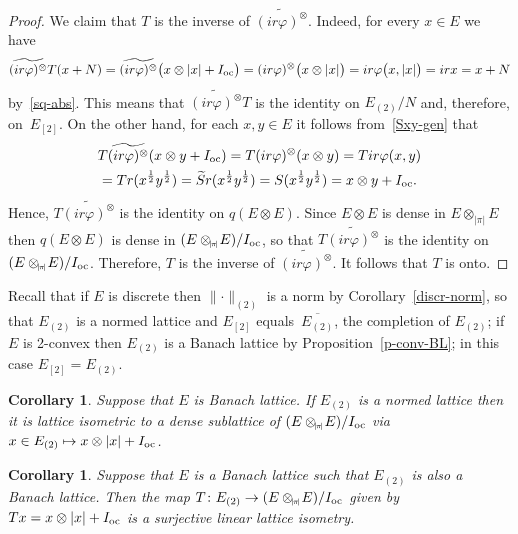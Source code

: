 \documentclass[12pt]{amsart}
\theoremstyle{plain}
\newtheorem{corollary}[theorem]{Corollary}
\theoremstyle{definition}
\newcommand{\abs}[1]{\lvert#1\rvert}
\newcommand{\norm}[1]{\lVert#1\rVert}
\def\api{{\abs{\!\pi\!}}}
\def\ftp{\otimes_{\!\scriptscriptstyle\api}\!}
\def\Ioc{I_{\rm oc}}
\begin{document}
\begin{proof}
  We claim that $T$ is the inverse of
  $\widetilde{(ir\varphi)^\otimes}$. Indeed, for every $x\in E$
  we have
  \begin{displaymath}
     \widetilde{(ir\varphi)^\otimes}T(x+N)=
     \widetilde{(ir\varphi)^\otimes}\bigl(x\otimes\abs{x}+\Ioc\bigr)
     =(ir\varphi)^\otimes\bigl(x\otimes\abs{x}\bigr)
     =ir\varphi\bigl(x,\abs{x}\bigr)=irx=x+N
  \end{displaymath}
  by~\eqref{sq-abs}. This means that $\widetilde{(ir\varphi)^\otimes}T$
  is the identity on $E_{(2)}/N$ and, therefore, on~$E_{[2]}$.
  On the other hand, for each $x,y\in E$ it follows
  from~\eqref{Sxy-gen} that
  \begin{multline*}
    T\widetilde{(ir\varphi)^\otimes}(x\otimes y+\Ioc)
    =T(ir\varphi)^\otimes(x\otimes y)
    =Tir\varphi(x,y)\\
    =Tr(x^{\frac{1}{2}}y^{\frac{1}{2}})
    =\widetilde Sr(x^{\frac{1}{2}}y^{\frac{1}{2}})
    =S(x^{\frac{1}{2}}y^{\frac{1}{2}})
    =x\otimes y+\Ioc.
  \end{multline*}
  Hence, $T\widetilde{(ir\varphi)^\otimes}$ is the identity on $q(E\otimes
  E)$.  Since $E\otimes E$ is dense in $E\ftp E$ then $q(E\otimes E)$
  is dense in $(E\ftp E)/\Ioc$, so that
  $T\widetilde{(ir\varphi)^\otimes}$ is the identity on $(E\ftp
  E)/\Ioc$.  Therefore, $T$ is the inverse of
  $\widetilde{(ir\varphi)^\otimes}$. It follows that $T$ is onto.
\end{proof}

Recall that if $E$ is discrete then $\norm{\cdot}_{(2)}$ is a norm by
Corollary~\ref{discr-norm}, so that $E_{(2)}$ is a normed lattice and
$E_{[2]}$ equals~$\overline{E_{(2)}}$, the completion of
$E_{(2)}$; if $E$ is 2-convex then $E_{(2)}$ is a Banach lattice by
Proposition~\ref{p-conv-BL}; in this case $E_{[2]}=E_{(2)}$.


\begin{corollary}\label{general-normed}
  Suppose that $E$ is Banach lattice. If $E_{(2)}$ is a normed
  lattice then it is lattice isometric to a dense sublattice of
  $(E\ftp E)/\Ioc$ via $x\in E_{(2)}\mapsto x\otimes\abs{x}+\Ioc$.
\end{corollary}


\begin{corollary}\label{general-BL}
  Suppose that $E$ is a Banach lattice such that $E_{(2)}$ is also a
  Banach lattice. Then the map $T\colon E_{(2)}\to(E\ftp E)/\Ioc$
  given by $Tx=x\otimes\abs{x}+\Ioc$ is a surjective linear lattice
  isometry.
\end{corollary}
\end{document}
